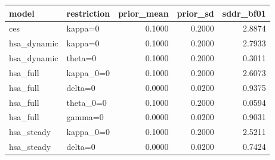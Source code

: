 \begin{tabular}{llrrr}
\toprule
model & restriction & prior\_mean & prior\_sd & sddr\_bf01 \\
\midrule
ces & kappa=0 & 0.1000 & 0.2000 & 2.8874 \\
hsa\_dynamic & kappa=0 & 0.1000 & 0.2000 & 2.7933 \\
hsa\_dynamic & theta=0 & 0.1000 & 0.2000 & 0.3011 \\
hsa\_full & kappa\_0=0 & 0.1000 & 0.2000 & 2.6073 \\
hsa\_full & delta=0 & 0.0000 & 0.0200 & 0.9375 \\
hsa\_full & theta\_0=0 & 0.1000 & 0.2000 & 0.0594 \\
hsa\_full & gamma=0 & 0.0000 & 0.0200 & 0.9031 \\
hsa\_steady & kappa\_0=0 & 0.1000 & 0.2000 & 2.5211 \\
hsa\_steady & delta=0 & 0.0000 & 0.0200 & 0.7424 \\
\bottomrule
\end{tabular}
